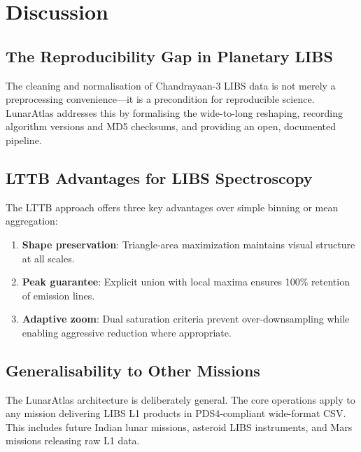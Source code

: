 \documentclass[a4paper,twocolumn,10pt]{article}
\begin{document}
\section{Discussion}
\label{sec:discussion}

\subsection{The Reproducibility Gap in Planetary LIBS}

The cleaning and normalisation of Chandrayaan-3 LIBS data is not
merely a preprocessing convenience---it is a precondition for
reproducible science.  LunarAtlas addresses this by formalising the
wide-to-long reshaping, recording algorithm versions and MD5 checksums,
and providing an open, documented pipeline.

\subsection{LTTB Advantages for LIBS Spectroscopy}

The LTTB approach offers three key advantages over simple binning or
mean aggregation:

\begin{enumerate}[nosep,leftmargin=*]
  \item \textbf{Shape preservation}: Triangle-area maximization
    maintains visual structure at all scales.
  \item \textbf{Peak guarantee}: Explicit union with local maxima
    ensures 100\% retention of emission lines.
  \item \textbf{Adaptive zoom}: Dual saturation criteria prevent
    over-downsampling while enabling aggressive reduction where
    appropriate.
\end{enumerate}

\subsection{Generalisability to Other Missions}

The LunarAtlas architecture is deliberately general.  The core
operations apply to any mission delivering LIBS L1 products in
PDS4-compliant wide-format CSV.  This includes future Indian lunar
missions, asteroid LIBS instruments, and Mars missions releasing
raw L1 data.
\end{document}
